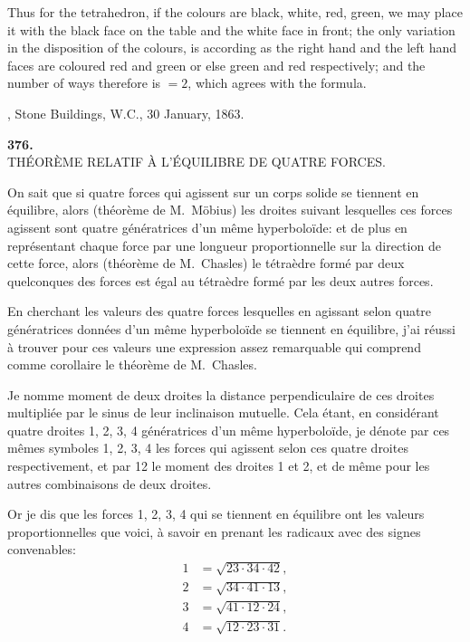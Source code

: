 \documentclass[11pt]{article}
\begin{document}
Thus for the tetrahedron, if the colours are black, white, red, green, we may place it with the black face on the table and the white face in front; the only variation in the disposition of the colours, is according as the right hand and the left hand faces are coloured red and green or else green and red respectively; and the number of ways therefore is $= 2$, which agrees with the formula.

\medskip{}, Stone Buildings, W.C., 30 January, 1863.

\bigskip

\begin{center}\textbf{376.}\\[2pt]
TH\'EOR\`EME RELATIF \`A L'\'EQUILIBRE DE QUATRE FORCES.\end{center}


\medskip

On sait que si quatre forces qui agissent sur un corps solide se tiennent en \'equilibre, alors (th\'eor\`eme de M.~M\"obius) les droites suivant lesquelles ces forces agissent sont quatre g\'en\'eratrices d'un m\^eme hyperbolo\"ide: et de plus en repr\'esentant chaque force par une longueur proportionnelle sur la direction de cette force, alors (th\'eor\`eme de M.~Chasles) le t\'etra\`edre form\'e par deux quelconques des forces est \'egal au t\'etra\`edre form\'e par les deux autres forces.

En cherchant les valeurs des quatre forces lesquelles en agissant selon quatre g\'en\'eratrices donn\'ees d'un m\^eme hyperbolo\"ide se tiennent en \'equilibre, j'ai r\'eussi \`a trouver pour ces valeurs une expression assez remarquable qui comprend comme corollaire le th\'eor\`eme de M.~Chasles.

Je nomme moment de deux droites la distance perpendiculaire de ces droites multipli\'ee par le sinus de leur inclinaison mutuelle. Cela \'etant, en consid\'erant quatre droites 1, 2, 3, 4 g\'en\'eratrices d'un m\^eme hyperbolo\"ide, je d\'enote par ces m\^emes symboles 1, 2, 3, 4 les forces qui agissent selon ces quatre droites respectivement, et par 12 le moment des droites 1 et 2, et de m\^eme pour les autres combinaisons de deux droites.

Or je dis que les forces 1, 2, 3, 4 qui se tiennent en \'equilibre ont les valeurs proportionnelles que voici, \`a savoir en prenant les radicaux avec des signes convenables:
\begin{align*}
1 &= \sqrt{23\cdot 34\cdot 42},\\
2 &= \sqrt{34\cdot 41\cdot 13},\\
3 &= \sqrt{41\cdot 12\cdot 24},\\
4 &= \sqrt{12\cdot 23\cdot 31}.
\end{align*}
\end{document}
